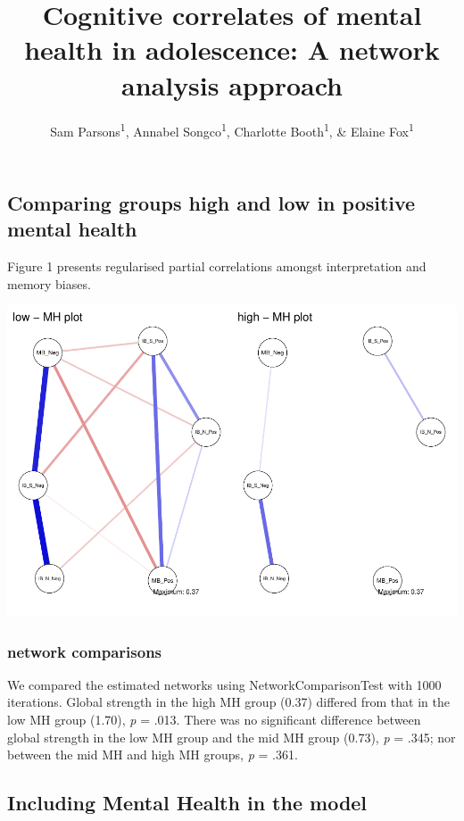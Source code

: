 \documentclass[man,floatsintext]{apa6}
\title{Cognitive correlates of mental health in adolescence: A network analysis approach}
\author{Sam Parsons\textsuperscript{1}, Annabel Songco\textsuperscript{1}, Charlotte Booth\textsuperscript{1}, \& Elaine Fox\textsuperscript{1}}
\date{}
\affiliation{
\vspace{0.5cm}
\textsuperscript{1} University of Oxford}
\begin{document}
\maketitle

\hypertarget{comparing-groups-high-and-low-in-positive-mental-health}{%
\subsection{Comparing groups high and low in positive mental health}\label{comparing-groups-high-and-low-in-positive-mental-health}}

Figure 1 presents regularised partial correlations amongst interpretation and memory biases.

\includegraphics{script_files/figure-latex/plotting_highlow-1.pdf}

\hypertarget{network-comparisons}{%
\subsubsection{network comparisons}\label{network-comparisons}}

We compared the estimated networks using NetworkComparisonTest with 1000 iterations. Global strength in the high MH group (0.37) differed from that in the low MH group (1.70), \emph{p} = .013. There was no significant difference between global strength in the low MH group and the mid MH group (0.73), \emph{p} = .345; nor between the mid MH and high MH groups, \emph{p} = .361.

\newpage

\hypertarget{including-mental-health-in-the-model}{%
\subsection{Including Mental Health in the model}\label{including-mental-health-in-the-model}}
\end{document}
